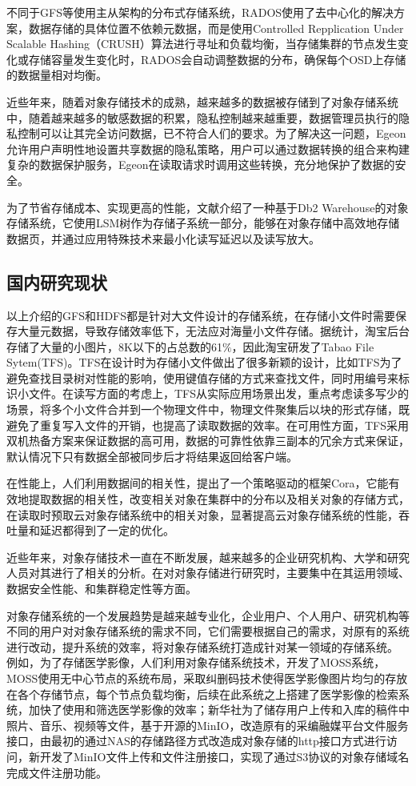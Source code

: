 不同于GFS等使用主从架构的分布式存储系统，RADOS使用了去中心化的解决方案，数据存储的具体位置不依赖元数据，而是使用Controlled Repplication Under Scalable Hashing\cite{21}（CRUSH）算法进行寻址和负载均衡，当存储集群的节点发生变化或存储容量发生变化时，RADOS会自动调整数据的分布，确保每个OSD上存储的数据量相对均衡。

近些年来，随着对象存储技术的成熟，越来越多的数据被存储到了对象存储系统中，随着越来越多的敏感数据的积累，隐私控制越来越重要，数据管理员执行的隐私控制可以让其完全访问数据，已不符合人们的要求。为了解决这一问题，Egeon\cite{22}允许用户声明性地设置共享数据的隐私策略，用户可以通过数据转换的组合来构建复杂的数据保护服务，Egeon在读取请求时调用这些转换，充分地保护了数据的安全。

为了节省存储成本、实现更高的性能，文献\cite{23}介绍了一种基于Db2 Warehouse的对象存储系统，它使用LSM树作为存储子系统一部分，能够在对象存储中高效地存储数据页，并通过应用特殊技术来最小化读写延迟以及读写放大。

\subsection{国内研究现状}%
以上介绍的GFS和HDFS都是针对大文件设计的存储系统，在存储小文件时需要保存大量元数据，导致存储效率低下，无法应对海量小文件存储。据统计，淘宝后台存储了大量的小图片，8K以下的占总数的61$\%$\cite{24}，因此淘宝研发了Tabao File Sytem\cite{25}(TFS)。TFS在设计时为存储小文件做出了很多新颖的设计，比如TFS为了避免查找目录树对性能的影响，使用键值存储的方式来查找文件，同时用编号来标识小文件。在读写方面的考虑上，TFS从实际应用场景出发，重点考虑读多写少的场景，将多个小文件合并到一个物理文件中，物理文件聚集后以块的形式存储，既避免了重复写入文件的开销，也提高了读取数据的效率。在可用性方面，TFS采用双机热备\cite{26}方案来保证数据的高可用，数据的可靠性依靠三副本的冗余方式来保证，默认情况下只有数据全部被同步后才将结果返回给客户端。

在性能上，人们利用数据间的相关性，提出了一个策略驱动的框架Cora\cite{27}，它能有效地提取数据的相关性，改变相关对象在集群中的分布以及相关对象的存储方式，在读取时预取云对象存储系统中的相关对象，显著提高云对象存储系统的性能，吞吐量和延迟都得到了一定的优化。

近些年来，对象存储技术一直在不断发展，越来越多的企业研究机构、大学和研究人员对其进行了相关的分析。在对对象存储进行研究时，主要集中在其运用领域、数据安全性能、和集群稳定性等方面。

对象存储系统的一个发展趋势是越来越专业化，企业用户、个人用户、研究机构等不同的用户对对象存储系统的需求不同，它们需要根据自己的需求，对原有的系统进行改动，提升系统的效率，将对象存储系统打造成针对某一领域的存储系统\cite{28,29}。 例如，为了存储医学影像，人们利用对象存储系统技术，开发了MOSS系统\cite{30}，MOSS使用无中心节点的系统布局，采取纠删码技术使得医学影像图片均匀的存放在各个存储节点，每个节点负载均衡，后续在此系统之上搭建了医学影像的检索系统，加快了使用和筛选医学影像的效率；新华社为了储存用户上传和入库的稿件中照片、音乐、视频等文件，基于开源的MinIO，改造原有的采编融媒平台文件服务接口\cite{31}，由最初的通过NAS的存储路径方式改造成对象存储的http接口方式进行访问，新开发了MinIO文件上传和文件注册接口，实现了通过S3协议的对象存储域名完成文件注册功能。

